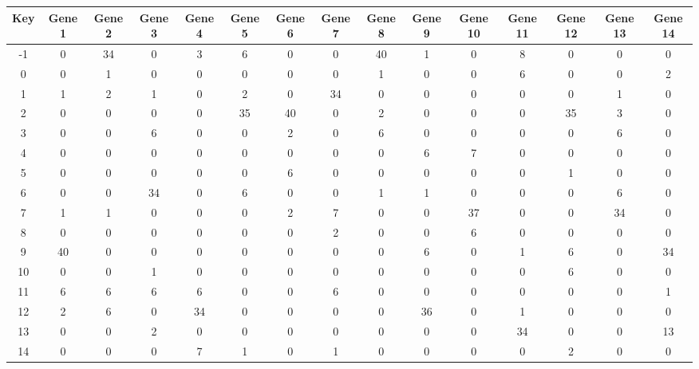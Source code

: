 \begin{tabular}{|c|c|c|c|c|c|c|c|c|c|c|c|c|c|c|}
\hline
Key & Gene 1 & Gene 2 & Gene 3 & Gene 4 & Gene 5 & Gene 6 & Gene 7 & Gene 8 & Gene 9 & Gene 10 & Gene 11 & Gene 12 & Gene 13 & Gene 14 \\
\hline
-1 & 0 & 34 & 0 & 3 & 6 & 0 & 0 & 40 & 1 & 0 & 8 & 0 & 0 & 0 \\
0 & 0 & 1 & 0 & 0 & 0 & 0 & 0 & 1 & 0 & 0 & 6 & 0 & 0 & 2 \\
1 & 1 & 2 & 1 & 0 & 2 & 0 & 34 & 0 & 0 & 0 & 0 & 0 & 1 & 0 \\
2 & 0 & 0 & 0 & 0 & 35 & 40 & 0 & 2 & 0 & 0 & 0 & 35 & 3 & 0 \\
3 & 0 & 0 & 6 & 0 & 0 & 2 & 0 & 6 & 0 & 0 & 0 & 0 & 6 & 0 \\
4 & 0 & 0 & 0 & 0 & 0 & 0 & 0 & 0 & 6 & 7 & 0 & 0 & 0 & 0 \\
5 & 0 & 0 & 0 & 0 & 0 & 6 & 0 & 0 & 0 & 0 & 0 & 1 & 0 & 0 \\
6 & 0 & 0 & 34 & 0 & 6 & 0 & 0 & 1 & 1 & 0 & 0 & 0 & 6 & 0 \\
7 & 1 & 1 & 0 & 0 & 0 & 2 & 7 & 0 & 0 & 37 & 0 & 0 & 34 & 0 \\
8 & 0 & 0 & 0 & 0 & 0 & 0 & 2 & 0 & 0 & 6 & 0 & 0 & 0 & 0 \\
9 & 40 & 0 & 0 & 0 & 0 & 0 & 0 & 0 & 6 & 0 & 1 & 6 & 0 & 34 \\
10 & 0 & 0 & 1 & 0 & 0 & 0 & 0 & 0 & 0 & 0 & 0 & 6 & 0 & 0 \\
11 & 6 & 6 & 6 & 6 & 0 & 0 & 6 & 0 & 0 & 0 & 0 & 0 & 0 & 1 \\
12 & 2 & 6 & 0 & 34 & 0 & 0 & 0 & 0 & 36 & 0 & 1 & 0 & 0 & 0 \\
13 & 0 & 0 & 2 & 0 & 0 & 0 & 0 & 0 & 0 & 0 & 34 & 0 & 0 & 13 \\
14 & 0 & 0 & 0 & 7 & 1 & 0 & 1 & 0 & 0 & 0 & 0 & 2 & 0 & 0 \\
\hline
\end{tabular}